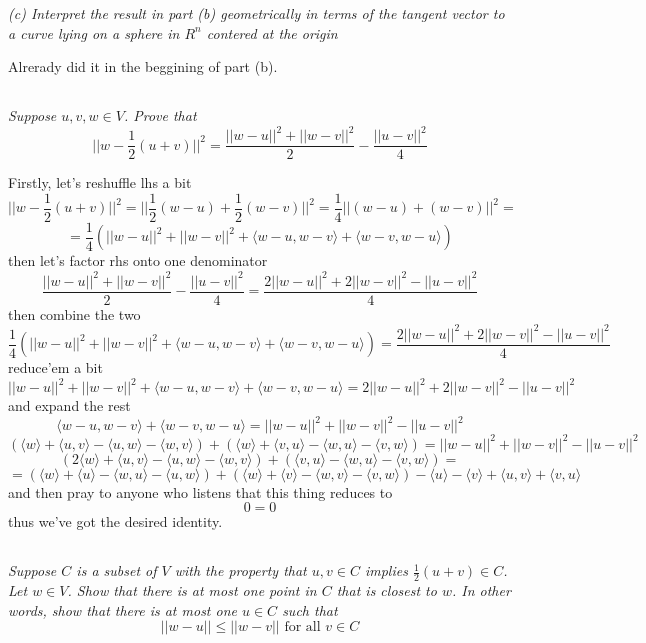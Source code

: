 \documentclass[11pt,oneside,titlepage]{book}
\newcommand{\eangle}[1]{\langle #1 \rangle}
\begin{document}
\textit{(c) Interpret the result in part (b) geometrically in terms of the tangent vector
  to a curve lying on a sphere in $R^n$ contered at the origin}

Alrerady did it in the beggining of part (b).


\subsection{}

\textit{Suppose $u, v, w \in V$. Prove that}
$$||w - \frac 1 2 (u + v)||^2 = \frac{||w - u||^2 + ||w - v||^2}{2} - \frac{||u - v||^2}{4}$$

Firstly, let's reshuffle lhs a bit
$$||w - \frac 1 2 (u + v)||^2 = ||\frac{1}{2}(w - u) + \frac{1}{2}(w - v)||^2 =
\frac{1}{4} ||(w - u) + (w - v)||^2 = 
$$
$$ = \frac{1}{4}( ||w - u||^2 + ||w - v||^2 + \eangle{w - u, w - v} + \eangle{w - v, w - u})$$
then let's factor rhs onto one denominator
$$\frac{||w - u||^2 + ||w - v||^2}{2} - \frac{||u - v||^2}{4} =
\frac{2 ||w - u||^2 + 2||w - v||^2 - ||u - v||^2}{4}$$
then combine the two
$$\frac{1}{4}( ||w - u||^2 + ||w - v||^2 + \eangle{w - u, w - v} + \eangle{w - v, w - u}) =
\frac{2 ||w - u||^2 + 2||w - v||^2 - ||u - v||^2}{4}$$
reduce'em a bit
$$||w - u||^2 + ||w - v||^2 + \eangle{w - u, w - v} + \eangle{w - v, w - u} =
2 ||w - u||^2 + 2||w - v||^2 - ||u - v||^2$$
and expand the rest
$$\eangle{w - u, w - v} + \eangle{w - v, w - u} = ||w - u||^2 + ||w - v||^2 - ||u - v||^2$$
$$(\eangle{w} + \eangle{u, v} - \eangle{u, w} - \eangle{w, v}) + (\eangle{w} + \eangle{v, u} -
\eangle{w, u} - \eangle{v, w}) = ||w - u||^2 + ||w - v||^2 - ||u - v||^2$$
$$(2\eangle{w} + \eangle{u, v} - \eangle{u, w} - \eangle{w, v}) + (\eangle{v, u} -
\eangle{w, u} - \eangle{v, w}) =
$$
$$ = (\eangle{w} + \eangle{u} - \eangle{w, u} - \eangle{u, w}) +
(\eangle{w} + \eangle{v} - \eangle{w, v} - \eangle{v, w}) - \eangle{u} - \eangle{v} +
\eangle{u, v} + \eangle{v, u}$$
and then pray to anyone who listens that this thing reduces to
$$0 = 0$$
thus we've got the desired identity.


\subsection{}

\textit{Suppose $C$ is a subset of $V$ with the property that $u, v \in C$ implies
  $\frac{1}{2}(u + v) \in C$. Let $w \in V$. Show that there is at most one point in $C$
  that is closest to $w$. In other words, show that there is at most one $u \in C$ such that}
$$||w - u|| \leq ||w - v|| \text{ for all } v \in C$$
\end{document}

